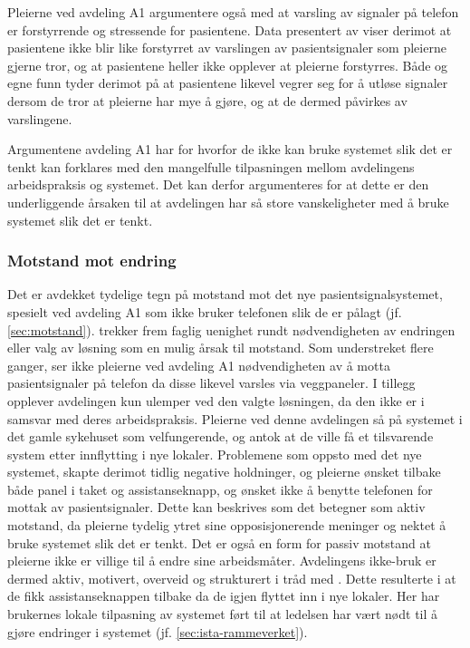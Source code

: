 \noindent
Pleierne ved avdeling A1 argumentere også med at varsling av signaler på telefon er forstyrrende og stressende for pasientene. Data presentert av \citet{Rygh13} viser derimot at pasientene ikke blir like forstyrret av varslingen av pasientsignaler som pleierne gjerne tror, og at pasientene heller ikke opplever at pleierne forstyrres. Både \citet{Rygh13} og egne funn tyder derimot på at pasientene likevel vegrer seg for å utløse signaler dersom de tror at pleierne har mye å gjøre, og at de dermed påvirkes av varslingene.

\noindent
Argumentene avdeling A1 har for hvorfor de ikke kan bruke systemet slik det er tenkt kan forklares med den mangelfulle tilpasningen mellom avdelingens arbeidspraksis og systemet. Det kan derfor argumenteres for at dette er den underliggende årsaken til at avdelingen har så store vanskeligheter med å bruke systemet slik det er tenkt. 

\subsubsection{Motstand mot endring}
Det er avdekket tydelige tegn på motstand mot det nye pasientsignalsystemet, spesielt ved avdeling A1 som ikke bruker telefonen slik de er pålagt (jf. \ref{sec:motstand}). \citet{Jacobsen12} trekker frem faglig uenighet rundt nødvendigheten av endringen eller valg av løsning som en mulig årsak til motstand. Som understreket flere ganger, ser ikke pleierne ved avdeling A1 nødvendigheten av å motta pasientsignaler på telefon da disse likevel varsles via veggpaneler. I tillegg opplever avdelingen kun ulemper ved den valgte løsningen, da den ikke er i samsvar med deres arbeidspraksis. Pleierne ved denne avdelingen så på systemet i det gamle sykehuset som velfungerende, og antok at de ville få et tilsvarende system etter innflytting i nye lokaler. Problemene som oppsto med det nye systemet, skapte derimot tidlig negative holdninger, og pleierne ønsket tilbake både panel i taket og assistanseknapp, og ønsket ikke å benytte telefonen for mottak av pasientsignaler. Dette kan beskrives som det \citet{Lapointe05} betegner som aktiv motstand, da pleierne tydelig ytret sine opposisjonerende meninger og nektet å bruke systemet slik det er tenkt. Det er også en form for passiv motstand at pleierne ikke er villige til å endre sine arbeidsmåter. Avdelingens ikke-bruk er dermed aktiv, motivert, overveid og strukturert i tråd med \citet{Satchell09}. Dette resulterte i at de fikk assistanseknappen tilbake da de igjen flyttet inn i nye lokaler. Her har brukernes lokale tilpasning av systemet ført til at ledelsen har vært nødt til å gjøre endringer i systemet (jf. \ref{sec:ista-rammeverket}). 


